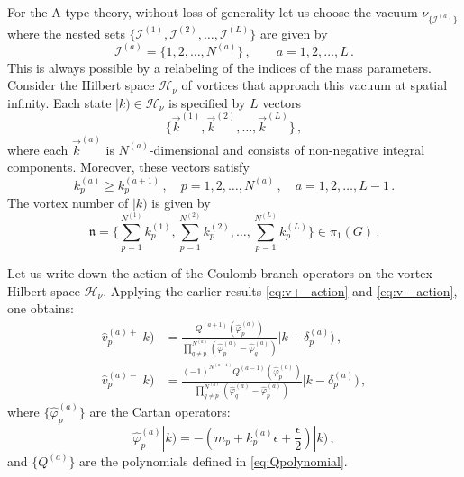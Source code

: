 \documentclass[12pt,a4paper]{article}
\newcommand{\nn}{\mathfrak{n}}
\newcounter{subsubsubsection}[subsubsection]
\renewcommand{\(}{\left(}
\renewcommand{\)}{\right)}
\newcommand{\eps}{\epsilon}
\renewcommand{\(}{\left(}
\renewcommand{\)}{\right)}
\begin{document}
\label{ssssec:Atype_vortex}
For the A-type theory, without loss of generality let us choose the vacuum $\nu_{\{\mathcal{I}^{(a)}\}}$ where the nested sets $\{\mathcal{I}^{(1)},\mathcal{I}^{(2)},\dots,\mathcal{I}^{(L)}\}$ are given by
\begin{equation}\label{eq:Atype_vac}
\mathcal{I}^{(a)}=\{1,2,\dots,N^{(a)}\}\,,\qquad a=1,2,\dots,L\,.
\end{equation}
This is always possible by a relabeling of the indices of the mass parameters. 
Consider the Hilbert space $\mathcal{H}_\nu$ of vortices that approach this vacuum at spatial infinity. Each state $|k)\in \mathcal{H}_\nu$ is specified by $L$ vectors 
\begin{equation}
    \{\vec{k}^{(1)},\vec{k}^{(2)},\dots,\vec{k}^{(L)}\}\,,
\end{equation}
where each $\vec{k}^{(a)}$ is $N^{(a)}$-dimensional and consists of non-negative integral components. 
Moreover, these vectors satisfy
\begin{equation}\label{eq:A_condi}
k^{(a)}_p\geq k^{(a+1)}_p\,, \quad p=1,2,\dots,N^{(a)}\,,\quad a=1,2,\dots,L-1\,.
\end{equation}
The vortex number of $|k)$ is given by
\begin{equation}
\nn=\{\sum_{p=1}^{N^{(1)}}k^{(1)}_p,\sum_{p=1}^{N^{(2)}}k^{(2)}_p,\dots,\sum_{p=1}^{N^{(L)}}k^{(L)}_p\}\in \pi_1(G)\,.    
\end{equation}

Let us write down the action of the Coulomb branch operators on the vortex Hilbert space $\mathcal{H}_\nu$. Applying the earlier results \eqref{eq:v+_action} and \eqref{eq:v-_action}, one obtains:
\begin{equation}
\begin{aligned}
\hat{v}_{p}^{(a)+} |k)&=\frac{Q^{(a+1)}(\hat{\varphi}^{(a)}_{p})}{\prod_{q\neq p}^{N^{(a)}}(\hat{\varphi}^{(a)}_{p}-\hat{\varphi}^{(a)}_{q})}|k+\delta^{(a)}_{p})\,,\\
\hat{v}_{p}^{(a)-} |k)&=\frac{(-1)^{N^{(a-1)}}Q^{(a-1)}(\hat{\varphi}^{(a)}_{p})}{\prod_{q\neq p}^{N^{(a)}}(\hat{\varphi}^{(a)}_{q}-\hat{\varphi}^{(a)}_{p})}|k-\delta^{(a)}_{p})\,,
\end{aligned}
\end{equation}
where $\{\hat{\varphi}^{(a)}_p\}$ are the Cartan operators:
\begin{equation}
    \hat{\varphi}^{(a)}_p|k)=-(m_p+k^{(a)}_p\eps+\frac{\eps}{2})|k)\,,
\end{equation}
and $\{Q^{(a)}\}$ are the polynomials defined in \eqref{eq:Qpolynomial}. 
\end{document}
